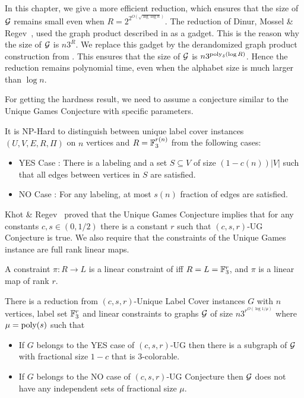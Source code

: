 In this chapter, we give a more efficient reduction, which ensures that the size
of $\calG$ remains small even when $R= 2^{2^{O(\sqrt{\log \log n})}}$. The reduction
of Dinur, Mossel \& Regev~\cite{DinurMR2009}, used the graph product described in
 as a gadget. This is the reason why the size of
$\calG$ is $n3^R$. We replace this gadget by the derandomized graph product
construction from . This ensures that the
size of $\calG$ is $n3^{\poly_\delta(\log R)}$. Hence the reduction remains
polynomial time, even when the alphabet size is much larger than $\log n$.

For getting the hardness result, we need to assume a conjecture similar to the
Unique Games Conjecture with specific parameters.

\begin{conjecture}[$(c(n),s(n),r(n))$-UG Conjecture]
 It is NP-Hard to
distinguish between unique label cover instances $(U,V,E,R,\Pi)$ on $n$ vertices
and $R=\F_3^{r(n)}$ from the following cases: 
\begin{itemize}
 \item YES Case :
There is a labeling and a set $S\subseteq V$ of size $(1-c(n))|V|$ such that all
edges between vertices in $S$ are satisfied. 
\item NO Case : For any labeling,
at most $s(n)$ fraction of edges are satisfied. 
\end{itemize} 
\end{conjecture}

Khot \& Regev~\cite{KhotR2008} proved that the Unique Games Conjecture implies
that for any constants $c, s \in (0,1/2)$ there is a constant $r$ such that
$(c,s,r)$-UG Conjecture is true. We also require that the constraints of the
Unique Games instance are full rank linear maps.

\begin{definition} 
A constraint $\pi:R \rightarrow L$ is a
linear constraint of iff $R = L=\F_3^r$, and $\pi$ is a linear map of rank $r$.
\end{definition}

\begin{theorem}\label{thm:col-hard} 
There is a reduction from $(c,s,r)$-Unique
Label Cover instances $G$ with $n$ vertices, label set $\F_3^r$ and linear
constraints to graphs $\cal G$ of size $n3^{r^{O(\log 1/\mu)}}$ where $\mu =
\poly(s)$ such that 
\begin{itemize} 
\item If $G$ belongs to the YES case of
$(c,s,r)$-UG then there is a subgraph of $\cal G$ with fractional size $1-c$
that is $3$-colorable. 
\item If $G$ belongs to the NO case of $(c,s,r)$-UG
Conjecture then $\cal G$ does not have any independent sets of fractional size
$\mu$. 
\end{itemize} 
\end{theorem} 

